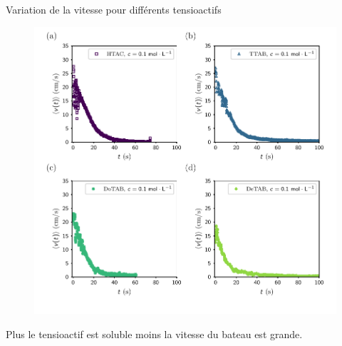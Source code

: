 \documentclass[aspectratio=169,10pt]{beamer}
\begin{document}
\begin{frame}{Variation de la vitesse pour différents tensioactifs}
  \begin{minipage}{8cm}
      \begin{figure}[!ht]
          \centering
          \includegraphics[scale=0.55]{./figures/Deceleration_vitesse_faible_concentration.pdf}
      \end{figure}
  \end{minipage}
  \begin{minipage}{5cm}
      \begin{table}
          \centering
          \caption{Tableau des vitesses initiales}
        \end{table}
        \begin{ombretheo}
          \begin{theo}
            Plus le tensioactif est soluble moins la vitesse du bateau est grande.
          \end{theo}
        \end{ombretheo}
  \end{minipage}
\end{frame}
\end{document}

